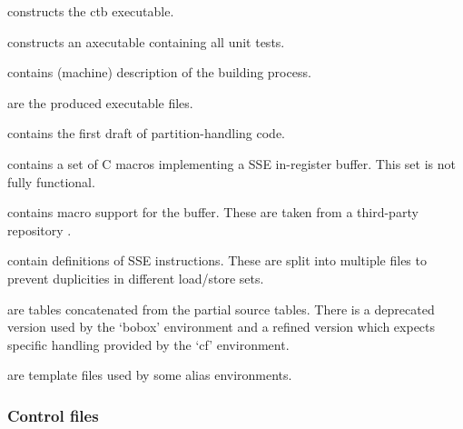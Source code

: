 \begin{description}
  \item {} constructs the ctb executable.
  \item {} constructs an axecutable containing all unit tests.
  \item {} contains (machine) description of the building process. 
  \item {} are the produced executable files.
  \item {} contains the first draft of partition-handling code.
  \item {} contains a set of C macros implementing a SSE in-register buffer. This set is not fully functional.
  \item {} contains macro support for the buffer. These are taken from a third-party repository \cite{cloak}.
  \item {} contain definitions of SSE instructions. These are split into multiple files to prevent duplicities in different load/store sets.
  \item {} are tables concatenated from the partial source tables. There is a deprecated version used by the `bobox' environment and a refined version which expects specific handling provided by the `cf' environment.
  \item {} are template files used by some alias environments.
\end{description}

\subsubsection{Control files}

